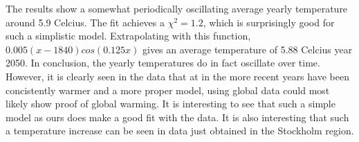 The results show a somewhat periodically oscillating average yearly temperature around 5.9 Celcius. The fit achieves a $\chi ^2=1.2$, which is surprisingly good for such a simplistic model. Extrapolating with this function, $0.005(x-1840)cos(0.125x)$ gives an average temperature of 5.88 Celcius year 2050. In conclusion, the yearly temperatures do in fact oscillate over time. However, it is clearly seen in the data that at in the more recent years have been concistently warmer and a more proper model, using global data could most likely show proof of global warming. It is interesting to see that such a simple model as ours does make a good fit with the data. It is also interesting that such a temperature increase can be seen in data just obtained in the Stockholm region. 





